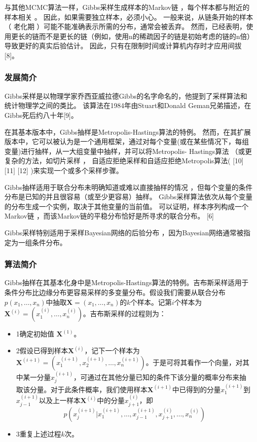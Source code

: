 \documentclass[twoside,twocolumn]{article}
\begin{document}
\begin{CJK*}{UTF8}{gkai}
	与其他MCMC算法一样，Gibbs采样生成样本的Markov链 ，每个样本都与附近的样本相关 。 因此，如果需要独立样本，必须小心。 一般来说，从链条开始的样本（ 老化期 ）可能不能准确表示所需的分布，通常会被丢弃。 然而，已经表明，使用更长的链而不是更长的链（例如，使用n的稀疏因子的链是初始考虑的链的n倍）导致更好的真实后验估计。 因此，只有在限制时间或计算机内存时才应用间拔[8]。
	\subsubsection{发展简介}
	Gibbs采样是以物理学家乔西亚威拉德Gibbs的名字命名的，他提到了采样算法和统计物理学之间的类比。 该算法在1984年由Stuart和Donald Geman兄弟描述，在Gibbs死后约八十年[9]。
	
	在其基本版本中，Gibbs抽样是Metropolis-Hastings算法的特例。 然而，在其扩展版本中，它可以被认为是一个通用框架，通过对每个变量(或在某些情况下，每组变量)进行抽样，从一大组变量中抽样，并可以将Metropolis- Hastings算法 （或更复杂的方法，如切片采样 ， 自适应拒绝采样和自适应拒绝Metropolis算法( [10] [11] [12] )来实现一个或多个采样步骤。
	
	Gibbs抽样适用于联合分布未明确知道或难以直接抽样的情况 ，但每个变量的条件分布是已知的并且很容易（或至少更容易）抽样。 Gibbs采样算法依次从每个变量的分布生成一个实例，取决于其他变量的当前值。 可以证明，样本序列构成一个Markov链 ，而该Markov链的平稳分布恰好是所寻求的联合分布。 [6]
	
	Gibbs采样特别适用于采样Bayesian网络的后验分布 ，因为Bayesian网络通常被指定为一组条件分布。 
	\subsubsection{算法简介}
	Gibbs抽样在其基本化身中是Metropolis-Hastings算法的特例。吉布斯采样适用于条件分布比边缘分布更容易采样的多变量分布。假设我们需要从联合分布$p(x_{1},\dots,x_{n})$中抽取$\mathbf{X} =(x_{1},\dots ,x_{n})$的$k$个样本。记第$i$个样本为$\mathbf{X} ^{(i)}=\left(x_{1}^{(i)},\dots,x_{n}^{(i)}\right)$。吉布斯采样的过程则为：
	\begin{itemize}
		\item[]{1}\quad 确定初始值 $\mathbf{X} ^{(1)}$。
		\item[]{2}\quad 假设已得到样本$\mathbf {X} ^{(i)}$，记下一个样本为$\mathbf{X} ^{(i+1)}=\left(x_{1}^{(i+1)},x_{2}^{(i+1)},\dots ,x_{n}^{(i+1)}\right)$。于是可将其看作一个向量，对其中某一分量$x_{j}^{(i+1)}$，可通过在其他分量已知的条件下该分量的概率分布来抽取该分量。对于此条件概率，我们使用样本$\mathbf {X} ^{(i+1)}$中已得到的分量$x_{1}^{(i+1)}$到$x_{j-1}^{(i+1)}$以及上一样本$\mathbf {X} ^{(i)}$中的分量$x_{j+1}^{(i)}$，即$$p\left(x_{j}^{(i+1)}|x_{1}^{(i+1)},\dots ,x_{j-1}^{(i+1)},x_{j+1}^{(i)},\dots ,x_{n}^{(i)}\right)$$
		\item[]{3}\quad 重复上述过程$k$次。
	\end{itemize}
	

\end{CJK*}
\end{document}
